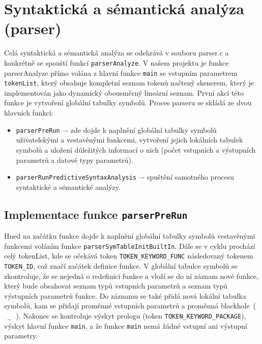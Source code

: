 \documentclass[a4paper, 12pt]{article}
\begin{document}
\section{Syntaktická a sémantická analýza (parser)}
Celá syntaktická a sémantická analýza se odehrává v souboru parser.c a konkrétně se spouští funkcí \verb|parserAnalyze|.
\newline
\newline
V našem projektu je funkce parserAnalyze přímo volána z hlavní funkce \verb|main| se vstupním parametrem \verb|tokenList|, který obsahuje kompletní seznam tokenů načtený skenerem, který je implementován jako dynamický obousměrný lineární seznam. První akcí této funkce je vytvoření globální tabulky symbolů.
\newline
\newline
Proces parseru se skládá ze dvou hlavních funkcí:

\begin{itemize}

    \item \verb|parserPreRun| –- zde dojde k naplnění globální tabulky symbolů uživatelskými a vestavěnými funkcemi, vytvoření jejich lokálních tabulek symbolů a uložení důležitých informací o nich (počet vstupních a výstupních parametrů a datové typy parametrů).
    \item \verb|parserRunPredictiveSyntaxAnalysis| –- spuštění samotného procesu syntaktické a sémantické analýzy.
    
\end{itemize}





\subsection{Implementace funkce \protect\Verb|parserPreRun|}
Hned na začátku funkce dojde k naplnění globální tabulky symbolů vestavěnými funkcemi voláním funkce \verb|parserSymTableInitBuiltIn|.
\newline
\newline
Dále se v cyklu prochází celý tokenList, kde se očekává token \verb|TOKEN_KEYWORD_FUNC| následovaný tokenem \verb|TOKEN_ID|, což značí začátek definice funkce. V globální tabulce symbolů se zkontroluje, že se nejedná o redefinici funkce a vloží se do ní záznam nové funkce, který bude obsahovat seznam typů vstupních parametrů a seznam typů výstupních parametrů funkce. Do záznamu se také přidá nová lokální tabulka symbolů, kam se přidají proměnné vstupních parametrů a proměnná blackhole~(\,~\verb|_|\,~).
\newline
\newline
Nakonec se kontroluje výskyt prologu (token \verb|TOKEN_KEYWORD_PACKAGE|), výskyt hlavní funkce \verb|main|, a že funkce \verb|main| nemá žádné vstupní ani výstupní parametry.
\end{document}

